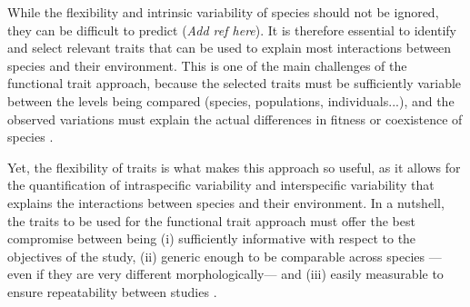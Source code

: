 While the flexibility and intrinsic variability of species should not be ignored, they can be difficult to predict (\emph{Add ref here}). It is therefore essential to identify and select relevant traits that can be used to explain most interactions between species and their environment. This is one of the main challenges of the functional trait approach, because the selected traits must be sufficiently variable between the levels being compared (species, populations, individuals...), and the observed variations must explain the actual differences in fitness or coexistence of species \citep{kremer2017}. 

Yet, the flexibility of traits is what makes this approach so useful, as it allows for the quantification of intraspecific variability \citep[especially as environmental conditions change,][]{martini2020} and interspecific variability that explains the interactions between species and their environment. In a nutshell, the traits to be used for the functional trait approach must offer the best compromise between being (i) sufficiently informative with respect to the objectives of the study, (ii) generic enough to be comparable across species ---even if they are very different morphologically--- and (iii) easily measurable to ensure repeatability between studies \citep{dumay2004, kremer2017}.


